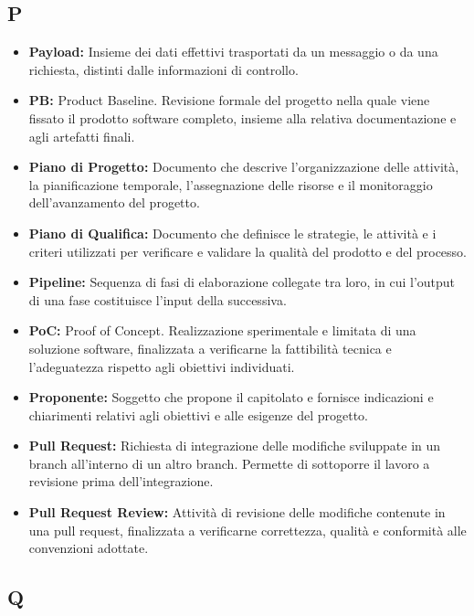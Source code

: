 \subsection*{P}

\begin{itemize}
    \item \textbf{Payload:} Insieme dei dati effettivi trasportati da un messaggio o da una richiesta, distinti dalle informazioni di controllo.
    \item \textbf{PB:} Product Baseline. Revisione formale del progetto nella quale viene fissato il prodotto software completo, insieme alla relativa documentazione e agli artefatti finali.
    \item \textbf{Piano di Progetto:} Documento che descrive l'organizzazione delle attività, la pianificazione temporale, l'assegnazione delle risorse e il monitoraggio dell'avanzamento del progetto.
    \item \textbf{Piano di Qualifica:} Documento che definisce le strategie, le attività e i criteri utilizzati per verificare e validare la qualità del prodotto e del processo.
    \item \textbf{Pipeline:} Sequenza di fasi di elaborazione collegate tra loro, in cui l'output di una fase costituisce l'input della successiva.
    \item \textbf{PoC:} Proof of Concept. Realizzazione sperimentale e limitata di una soluzione software, finalizzata a verificarne la fattibilità tecnica e l'adeguatezza rispetto agli obiettivi individuati.
    \item \textbf{Proponente:} Soggetto che propone il capitolato e fornisce indicazioni e chiarimenti relativi agli obiettivi e alle esigenze del progetto.
    \item \textbf{Pull Request:} Richiesta di integrazione delle modifiche sviluppate in un branch all'interno di un altro branch. Permette di sottoporre il lavoro a revisione prima dell'integrazione.
    \item \textbf{Pull Request Review:} Attività di revisione delle modifiche contenute in una pull request, finalizzata a verificarne correttezza, qualità e conformità alle convenzioni adottate.
\end{itemize}


{}
\subsection*{Q}

